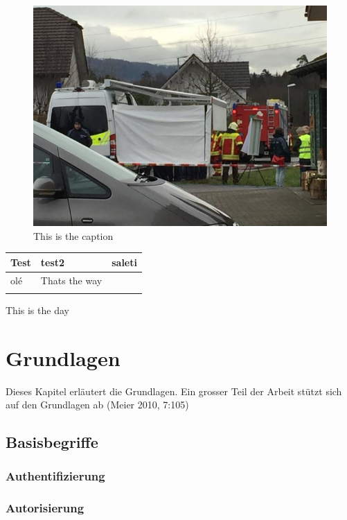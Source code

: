 \begin{figure}[htbp]
\centering
\includegraphics{images/image.jpg}
\caption{This is the caption}
\end{figure}

\begin{longtable}[c]{@{}lll@{}}
\toprule
Test & test2 & saleti\tabularnewline
\midrule
\endhead
olé & Thats the way\tabularnewline
\tabularnewline
\bottomrule
\end{longtable}

This is the day

\newpage

\chapter{Grundlagen}\label{grundlagen}

Dieses Kapitel erläutert die Grundlagen. Ein grosser Teil der Arbeit
stützt sich auf den Grundlagen ab (Meier 2010, 7:105)

\section{Basisbegriffe}\label{basisbegriffe}

\hypertarget{authentifizierung-1}{\subsection{Authentifizierung}\label{authentifizierung-1}}

\subsection{Autorisierung}\label{autorisierung-1}

